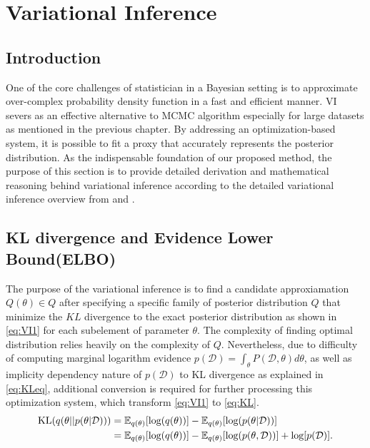 \section{Variational Inference}
\label{VI}
\subsection{Introduction}
One of the core challenges of statistician in a Bayesian setting is to approximate over-complex probability density function in a fast and efficient manner. VI severs as an effective alternative to MCMC algorithm especially for large datasets as mentioned in the previous chapter. By addressing an optimization-based system, it is possible to fit a proxy that accurately represents the posterior distribution. As the indispensable foundation of our proposed method, the purpose of this section is to provide detailed derivation and mathematical reasoning behind variational inference according to the detailed variational inference overview from \cite{blei_kucukelbir_mcauliffe_2017} and \cite{bishop_2006}.
\subsection{KL divergence and Evidence Lower Bound(ELBO)}
The purpose of the variational inference is to find a candidate approxiamation  $Q(\theta) \in Q$ after specifying a specific family of posterior distribution $Q$ that minimize the $KL$ divergence to the exact posterior distribution as shown in \autoref{eq:VI1} for each subelement of parameter $\theta$. The complexity of finding optimal distribution relies heavily on the complexity of $Q$. Nevertheless, due to difficulty of computing marginal logarithm evidence $p(\mathcal{D}) = \int_{\theta} P(\mathcal{D},\theta)d\theta$, as well as implicity dependency nature of $p(\mathcal{D})$ to KL divergence as explained in \autoref{eq:KLeq}, additional conversion is required for further processing this optimization system, which transform \autoref{eq:VI1} to \autoref{eq:KL}. 
\begin{equation}
	\label{eq:KLeq}
	\begin{aligned}
		\text{KL}(q(\theta||p(\theta|\mathcal{D}))) &= \mathop{\mathbb{E}_{q(\theta)}}[\textnormal{log}(q(\theta))] - \mathop{\mathbb{E}_{q(\theta)}}[\textnormal{log}(p(\theta|\mathcal{D}))]\\
		& = 
		\mathop{\mathbb{E}_{q(\theta)}}[\textnormal{log}(q(\theta))] - \mathop{\mathbb{E}_{q(\theta)}}[\textnormal{log}(p(\theta,\mathcal{D}))]+ \textnormal{log}[p(\mathcal{D})].\\
	\end{aligned}
\end{equation}
